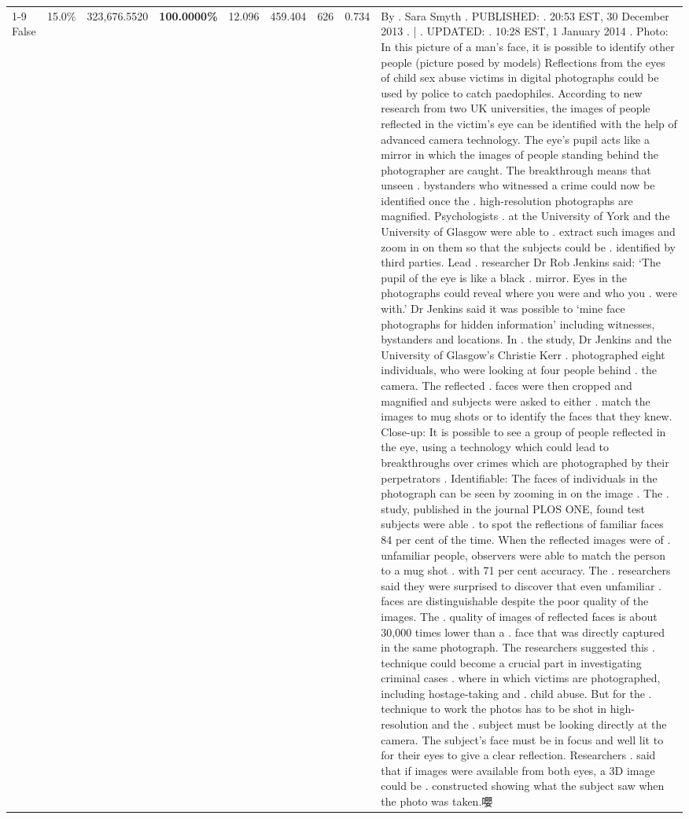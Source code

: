 \begin{table}[H]
\begin{tabular}{lllrlllll}
\cline{1-9}
False & 15.0\% & 323,676.5520 & \bfseries \color{red} 100.0000\% & 12.096 & 459.404 & 626 & 0.734 & By . Sara Smyth . PUBLISHED: . 20:53 EST, 30 December 2013 . | . UPDATED: . 10:28 EST, 1 January 2014 . Photo: In this picture of a man's face, it is possible to identify other people (picture posed by models) Reflections from the eyes of child sex abuse victims in digital photographs could be used by police to catch paedophiles. According to new research from two UK universities, the images of people reflected in the victim's eye can be identified with the help of advanced camera technology. The eye's pupil acts like a mirror in which the images of people standing behind the photographer are caught. The breakthrough means that unseen . bystanders who witnessed a crime could now be identified once the . high-resolution photographs are magnified. Psychologists . at the University of York and the University of Glasgow were able to . extract such images and zoom in on them so that the subjects could be . identified by third parties. Lead . researcher Dr Rob Jenkins said: ‘The pupil of the eye is like a black . mirror. Eyes in the photographs could reveal where you were and who you . were with.' Dr Jenkins said it was possible to ‘mine face photographs for hidden information' including witnesses, bystanders and locations. In . the study, Dr Jenkins and the University of Glasgow's Christie Kerr . photographed eight individuals, who were looking at four people behind . the camera. The reflected . faces were then cropped and magnified and subjects were asked to either . match the images to mug shots or to identify the faces that they knew. Close-up: It is possible to see a group of people reflected in the eye, using a technology which could lead to breakthroughs over crimes which are photographed by their perpetrators . Identifiable: The faces of individuals in the photograph can be seen by zooming in on the image . The . study, published in the journal PLOS ONE, found test subjects were able . to spot the reflections of familiar faces 84 per cent of the time. When the reflected images were of . unfamiliar people, observers were able to match the person to a mug shot . with 71 per cent accuracy. The . researchers said they were surprised to discover that even unfamiliar . faces are distinguishable despite the poor quality of the images. The . quality of images of reflected faces is about 30,000 times lower than a . face that was directly captured in the same photograph. The researchers suggested this . technique could become a crucial part in investigating criminal cases . where in which victims are photographed, including hostage-taking and . child abuse. But for the . technique to work the photos has to be shot in high-resolution and the . subject must be looking directly at the camera. The subject's face must be in focus and well lit to for their eyes to give a clear reflection. Researchers . said that if images were available from both eyes, a 3D image could be . constructed showing what the subject saw when the photo was taken.嚶 \\

\end{tabular}
\end{table}
